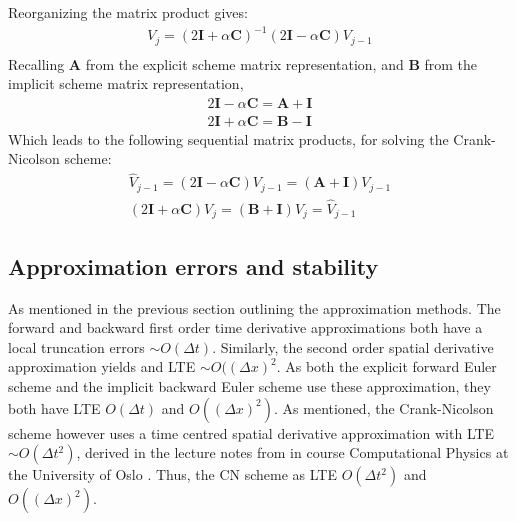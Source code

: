 \documentclass[%
oneside,                 %
final,                   %
10pt]{article}
\begin{document}
Reorganizing the matrix product gives:
\begin{align}
V_j=(2 \mathbf{I}+\alpha \mathbf{C})^{-1} (2\mathbf{I}-\alpha \mathbf{C})V_{j-1} \\
\end{align} 
Recalling \textbf{A} from the explicit scheme matrix representation, and \textbf{B} from the implicit scheme matrix representation, 
\begin{align}
2\mathbf{I}-\alpha \mathbf{C} = \textbf{A}+\mathbf{I}\\
2 \mathbf{I}+\alpha \mathbf{C}=\mathbf{B}-\mathbf{I}
\end{align} 
Which leads to the following sequential matrix products, for solving the Crank-Nicolson scheme:
\begin{align}
\hat{V}_{j-1}=(2\mathbf{I}-\alpha \mathbf{C})V_{j-1}= (\textbf{A}+\mathbf{I})V_{j-1} \\
(2 \mathbf{I}+\alpha \mathbf{C}) V_j=(\mathbf{B}+\mathbf{I}) V_j=\hat{V}_{j-1}
\end{align}
\subsection{Approximation errors and stability}
As mentioned in the previous section outlining the approximation methods. The forward and backward first order time derivative approximations both have a local truncation errors $\sim O(\Delta t)$. Similarly, the second order spatial derivative approximation yields and LTE $\sim O((\Delta x)^2$. As both the explicit forward Euler scheme and the implicit backward Euler scheme use these approximation, they both have LTE $O(\Delta t)$ and $O((\Delta x)^2)$. As mentioned, the Crank-Nicolson scheme however uses a time centred spatial derivative approximation with LTE $\sim O(\Delta t^2)$, derived in the lecture notes from in course Computational Physics at the University of Oslo \citep[p.311]{HJ15}. Thus, the CN scheme as LTE $O(\Delta t^2)$ and $O((\Delta x)^2)$. \newline
\end{document}
